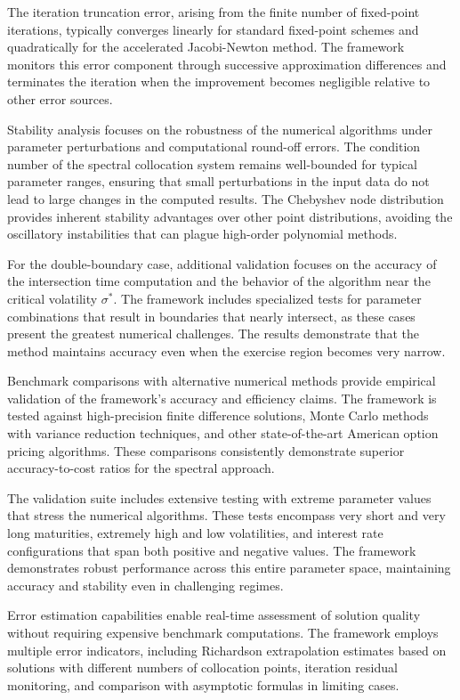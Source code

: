 \documentclass[
  american,
  11pt,
  11pt,
  letterpaper,
  onecolumn]{article}
\begin{document}
The iteration truncation error, arising from the finite number of
fixed-point iterations, typically converges linearly for standard
fixed-point schemes and quadratically for the accelerated Jacobi-Newton
method. The framework monitors this error component through successive
approximation differences and terminates the iteration when the
improvement becomes negligible relative to other error sources.

Stability analysis focuses on the robustness of the numerical algorithms
under parameter perturbations and computational round-off errors. The
condition number of the spectral collocation system remains well-bounded
for typical parameter ranges, ensuring that small perturbations in the
input data do not lead to large changes in the computed results. The
Chebyshev node distribution provides inherent stability advantages over
other point distributions, avoiding the oscillatory instabilities that
can plague high-order polynomial methods.

For the double-boundary case, additional validation focuses on the
accuracy of the intersection time computation and the behavior of the
algorithm near the critical volatility \(\sigma^*\). The framework
includes specialized tests for parameter combinations that result in
boundaries that nearly intersect, as these cases present the greatest
numerical challenges. The results demonstrate that the method maintains
accuracy even when the exercise region becomes very narrow.

Benchmark comparisons with alternative numerical methods provide
empirical validation of the framework's accuracy and efficiency claims.
The framework is tested against high-precision finite difference
solutions, Monte Carlo methods with variance reduction techniques, and
other state-of-the-art American option pricing algorithms. These
comparisons consistently demonstrate superior accuracy-to-cost ratios
for the spectral approach.

The validation suite includes extensive testing with extreme parameter
values that stress the numerical algorithms. These tests encompass very
short and very long maturities, extremely high and low volatilities, and
interest rate configurations that span both positive and negative
values. The framework demonstrates robust performance across this entire
parameter space, maintaining accuracy and stability even in challenging
regimes.

Error estimation capabilities enable real-time assessment of solution
quality without requiring expensive benchmark computations. The
framework employs multiple error indicators, including Richardson
extrapolation estimates based on solutions with different numbers of
collocation points, iteration residual monitoring, and comparison with
asymptotic formulas in limiting cases.
\end{document}

